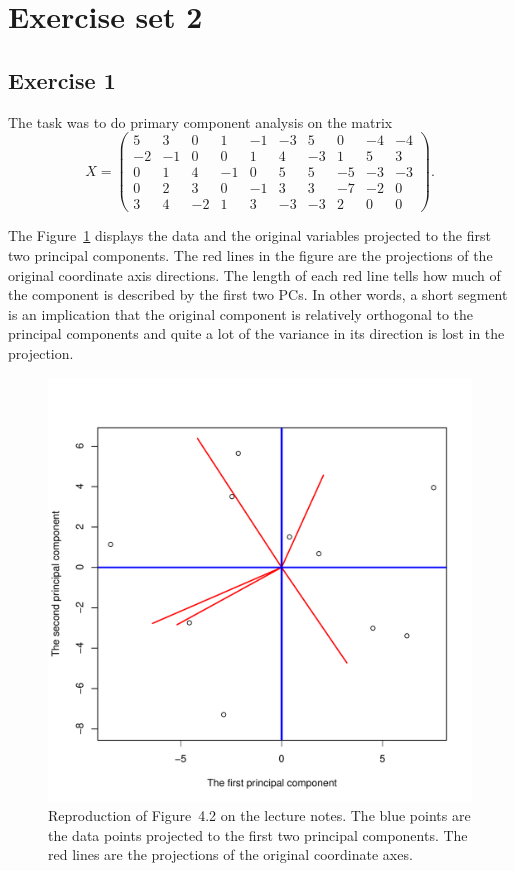 \documentclass{article}
\begin{document}
\clearpage
\section{Exercise set 2}
\newcommand{\X}{\ensuremath{\mathbf{X}}}
\subsection{Exercise 1}
The task was to do primary component analysis on the matrix
$$ X =
\begin{pmatrix}
	5 & 3 & 0 & 1 & -1 & -3 & 5 & 0 & -4 & -4 \\
	-2 & -1 & 0 & 0 & 1 & 4 & -3 & 1 & 5 & 3 \\
	0 & 1 & 4 & -1 & 0 & 5 & 5 & -5 & -3 & -3 \\
	0 & 2 & 3 & 0 & -1 & 3 & 3 & -7 & -2 & 0 \\
	3 & 4 & -2 & 1 & 3 & -3 & -3 & 2 & 0 & 0
\end{pmatrix}.
$$

The Figure~\ref{fig:42} displays the data and the original variables projected to the first two principal components.
The red lines in the figure are the projections of the original coordinate axis directions.
The length of each red line tells how much of the component is described by the first two PCs.
In other words, a short segment is an implication that the original component is relatively orthogonal to the principal components and quite a lot of the variance in its direction is lost in the projection.

\begin{figure}\centering
	\includegraphics[scale=\sscale]{fig42}
	\caption{Reproduction of Figure~4.2 on the lecture notes.
	The blue points are the data points projected to the first two principal components.
The red lines are the projections of the original coordinate axes.}\label{fig:42}
\end{figure}
\end{document}
